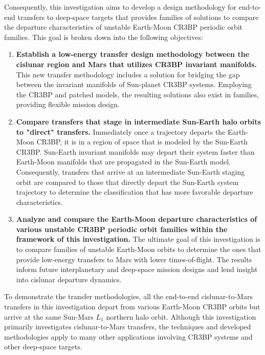 Consequently, this investigation aims to develop a design methodology for end-to-end transfers to
deep-space targets that provides families of solutions to compare the departure characteristics of
unstable Earth-Moon CR3BP periodic orbit families. This goal is broken down into the following
objectives:
\begin{enumerate}
    \item   \textbf{Establish a low-energy transfer design methodology between the cislunar region
			and Mars that utilizes CR3BP invariant manifolds.} This new transfer methodology
			includes a solution for bridging the gap between the invariant manifolds of Sun-planet
			CR3BP systems. Employing the CR3BP and patched models, the resulting solutions also
			exist in families, providing flexible mission design.
    \item   \textbf{Compare transfers that stage in intermediate Sun-Earth halo orbits to "direct"
			transfers.} Immediately once a trajectory departs the Earth-Moon CR3BP, it is in a
			region of space that is modeled by the Sun-Earth CR3BP. Sun-Earth invariant manifolds
			may depart their system faster than Earth-Moon manifolds that are propagated in the
			Sun-Earth model. Consequently, transfers that arrive at an intermediate Sun-Earth
			staging orbit are compared to those that directly depart the Sun-Earth system
			trajectory to determine the classification that has more favorable departure
			characteristics.
\newpage
    \item   \textbf{Analyze and compare the Earth-Moon departure characteristics of various
			unstable CR3BP periodic orbit families within the framework of this investigation.} The
			ultimate goal of this investigation is to compare families of unstable Earth-Moon
			orbits to determine the ones that provide low-energy transfers to Mars with lower
			times-of-flight. The results inform future interplanetary and deep-space mission
			designs and lend insight into cislunar departure dynamics.

\end{enumerate}
To demonstrate the transfer methodologies, all the end-to-end cislunar-to-Mars transfers in this
investigation depart from various Earth-Moon CR3BP orbits but arrive at the same Sun-Mars $L_{1}$
northern halo orbit. Although this investigation primarily investigates cislunar-to-Mars transfers,
the techniques and developed methodologies apply to many other applications involving CR3BP systems
and other deep-space targets.

